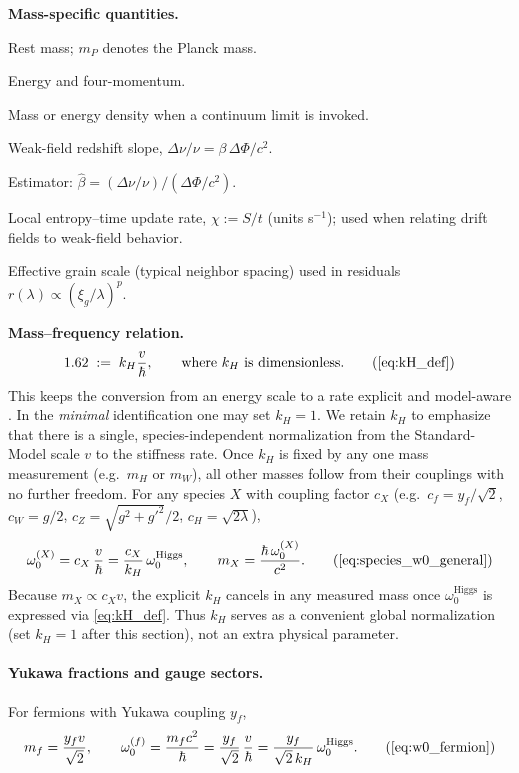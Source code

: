 \noindent\textbf{Mass-specific quantities.}
\begin{description}[leftmargin=2.4em,labelsep=0.8em]
  \item[\(m\)] Rest mass; \(m_P\) denotes the Planck mass.
  \item[\(E=mc^2,\,p^\mu\)] Energy and four-momentum.
  \item[\(\rho\)] Mass or energy density when a continuum limit is invoked.
  \item[\(\beta\)] Weak-field redshift slope, \(\Delta\nu/\nu = \beta\,\Delta\Phi/c^2.\)
  \item[\(\hat\beta\)] Estimator: \(\hat\beta = (\Delta\nu/\nu)\big/(\Delta\Phi/c^2).\)
  \item[\(\chi\)] Local entropy–time update rate, \(\chi := S/t\) (units s\(^{-1}\)); used when relating drift fields to weak-field behavior.
  \item[\(\xi_g\)] Effective grain scale (typical neighbor spacing) used in residuals \(r(\lambda)\propto(\xi_g/\lambda)^p.\)
\end{description}

\bigskip
\noindent\textbf{Mass–frequency relation.}
\[
  1.62 \;:=\; k_H \frac{v}{\hbar}, \qquad \text{where $k_H$ is dimensionless.}
  \tag{\ref{eq:kH_def}}
\]
This keeps the conversion from an energy scale to a rate explicit and model-aware \cite{tiesinga2021codata}.  
In the \emph{minimal} identification one may set \(k_H=1\).  
We retain \(k_H\) to emphasize that there is a single, species-independent normalization from the Standard-Model scale \(v\) to the stiffness rate.  
Once \(k_H\) is fixed by any one mass measurement (e.g.\ \(m_H\) or \(m_W\)), all other masses follow from their couplings with no further freedom.  
For any species \(X\) with coupling factor \(c_X\) (e.g.\ \(c_f=y_f/\sqrt{2}\), \(c_W=g/2\), \(c_Z=\sqrt{g^2+g'^2}/2\), \(c_H=\sqrt{2\lambda}\)),
\[
  \omega_0^{(X)}
    = c_X\,\frac{v}{\hbar}
    = \frac{c_X}{k_H}\,\omega_0^{\mathrm{Higgs}},
  \qquad
  m_X
    = \frac{\hbar\,\omega_0^{(X)}}{c^2}.
  \tag{\ref{eq:species_w0_general}}
\]
Because \(m_X\propto c_X v\), the explicit \(k_H\) cancels in any measured mass once \(\omega_0^{\mathrm{Higgs}}\) is expressed via \eqref{eq:kH_def}.  
Thus \(k_H\) serves as a convenient global normalization (set \(k_H=1\) after this section), not an extra physical parameter.

\paragraph{Yukawa fractions and gauge sectors.}
For fermions with Yukawa coupling \(y_f\),
\[
  m_f = \frac{y_f v}{\sqrt{2}}, \qquad
  \omega_0^{(f)} = \frac{m_f c^2}{\hbar}
                 = \frac{y_f}{\sqrt{2}}\,\frac{v}{\hbar}
                 = \frac{y_f}{\sqrt{2}\,k_H}\,\omega_0^{\mathrm{Higgs}}.
  \tag{\ref{eq:w0_fermion}}
\]

